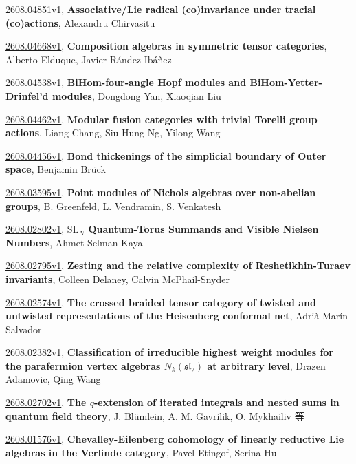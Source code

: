 \documentclass[9pt, a4paper]{article}
\theoremstyle{plain}
\theoremstyle{definition}
\theoremstyle{remark}
\newcommand{\arxiv}[3]{\href{https://arxiv.org/abs/#1}{#1}, \textbf{\textcolor{arxivblue}{#2}}, #3}
\begin{document}
\arxiv{2608.04851v1}{Associative/Lie radical (co)invariance under tracial (co)actions}{Alexandru Chirvasitu}

\arxiv{2608.04668v1}{Composition algebras in symmetric tensor categories}{Alberto Elduque, Javier Rández-Ibáñez}

\arxiv{2608.04538v1}{BiHom-four-angle Hopf modules and BiHom-Yetter-Drinfel'd modules}{Dongdong Yan, Xiaoqian Liu}

\arxiv{2608.04462v1}{Modular fusion categories with trivial Torelli group actions}{Liang Chang, Siu-Hung Ng, Yilong Wang}

\arxiv{2608.04456v1}{Bond thickenings of the simplicial boundary of Outer space}{Benjamin Brück}

\arxiv{2608.03595v1}{Point modules of Nichols algebras over non-abelian groups}{B. Greenfeld, L. Vendramin, S. Venkatesh}

\arxiv{2608.02802v1}{$\mathrm{SL}_N$ Quantum-Torus Summands and Visible Nielsen Numbers}{Ahmet Selman Kaya}

\arxiv{2608.02795v1}{Zesting and the relative complexity of Reshetikhin-Turaev invariants}{Colleen Delaney, Calvin McPhail-Snyder}

\arxiv{2608.02574v1}{The crossed braided tensor category of twisted and untwisted representations of the Heisenberg conformal net}{Adrià Marín-Salvador}

\arxiv{2608.02382v1}{Classification of irreducible highest weight modules for the parafermion vertex algebras $N_k(\mathfrak{sl}_2)$ at arbitrary level}{Drazen Adamovic, Qing Wang}

\arxiv{2608.02702v1}{The $q$-extension of iterated integrals and nested sums in quantum field theory}{J. Blümlein, A. M. Gavrilik, O. Mykhailiv 等}

\arxiv{2608.01576v1}{Chevalley-Eilenberg cohomology of linearly reductive Lie algebras in the Verlinde category}{Pavel Etingof, Serina Hu}

\end{document}
